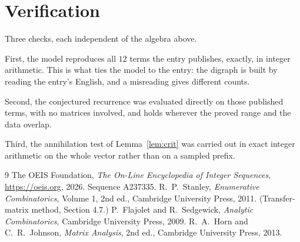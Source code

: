 \documentclass[11pt,a4paper]{article}
\theoremstyle{plain}
\theoremstyle{definition}
\begin{document}
\section{Verification}

Three checks, each independent of the algebra above.

First, the model reproduces all $12$ terms the entry publishes, exactly, in integer
arithmetic. This is what ties the model to the entry: the digraph is built by reading the
entry's English, and a misreading gives different counts.

Second, the conjectured recurrence was evaluated directly on those published terms, with no
matrices involved, and holds wherever the proved range and the data overlap.

Third, the annihilation test of Lemma~\ref{lem:crit} was carried out in exact integer
arithmetic on the whole vector rather than on a sampled prefix.

\begin{thebibliography}{9}
 The OEIS Foundation, \emph{The On-Line Encyclopedia of Integer
Sequences}, \url{https://oeis.org}, 2026. Sequence A237335.
 R.~P.~Stanley, \emph{Enumerative Combinatorics}, Volume 1, 2nd ed.,
Cambridge University Press, 2011. (Transfer-matrix method, Section 4.7.)
 P.~Flajolet and R.~Sedgewick, \emph{Analytic Combinatorics}, Cambridge
University Press, 2009.
 R.~A.~Horn and C.~R.~Johnson, \emph{Matrix Analysis}, 2nd ed., Cambridge
University Press, 2013.
\end{thebibliography}
\end{document}
